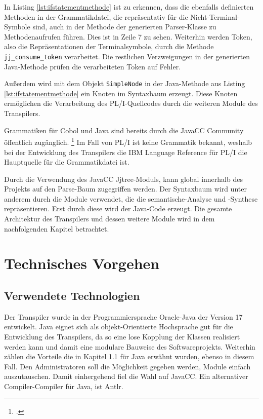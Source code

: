 In Listing \ref{lst:ifstatementmethode} ist zu erkennen, dass die ebenfalls definierten Methoden in der Grammatikdatei, die repräsentativ für die Nicht-Terminal-Symbole sind, auch in der Methode der generierten Parser-Klasse zu Methodenaufrufen führen. Dies ist in Zeile 7 zu sehen. Weiterhin werden Token, also die Repräsentationen der Terminalsymbole, durch die Methode \verb+jj_consume_token+ verarbeitet. Die restlichen Verzweigungen in der generierten Java-Methode prüfen die verarbeiteten Token auf Fehler.

Außerdem wird mit dem Objekt \verb+SimpleNode+ in der Java-Methode aus Listing \ref{lst:ifstatementmethode} ein Knoten im Syntaxbaum erzeugt. Diese Knoten ermöglichen die Verarbeitung des PL/I-Quellcodes durch die weiteren Module des Transpilers.

 
Grammatiken für Cobol und Java sind bereits durch die JavaCC Community öffentlich zugänglich. \footcite[Vgl. ][]{javaccdoku}
Im Fall von PL/I ist keine Grammatik bekannt, weshalb bei der Entwicklung des Transpilers die IBM Language Reference für PL/I die Hauptquelle für die Grammatikdatei ist.   

Durch die Verwendung des JavaCC Jjtree-Moduls, kann global innerhalb des Projekts auf den Parse-Baum zugegriffen werden. 
Der Syntaxbaum wird unter anderem durch die Module verwendet, die die semantische-Analyse und -Synthese repräsentieren.
Erst durch diese wird der Java-Code erzeugt.
Die gesamte Architektur des Transpilers und dessen weitere Module wird in dem nachfolgenden Kapitel betrachtet. 

\section{Technisches Vorgehen}
\subsection{Verwendete Technologien}

Der Transpiler wurde in der Programmiersprache Oracle-Java der Version 17 entwickelt. 
Java eignet sich als objekt-Orientierte Hochsprache gut für die Entwicklung des Transpilers, da so eine lose Kopplung der Klassen realisiert werden kann und damit eine modulare Bauweise des Softwareprojekts.
Weiterhin zählen die Vorteile die in Kapitel 1.1 für Java erwähnt wurden, ebenso in diesem Fall. Den Administratoren soll die Möglichkeit gegeben werden, Module einfach auszutauschen. 
Damit einhergehend fiel die Wahl auf JavaCC. Ein alternativer Compiler-Compiler für Java, ist Antlr. 

